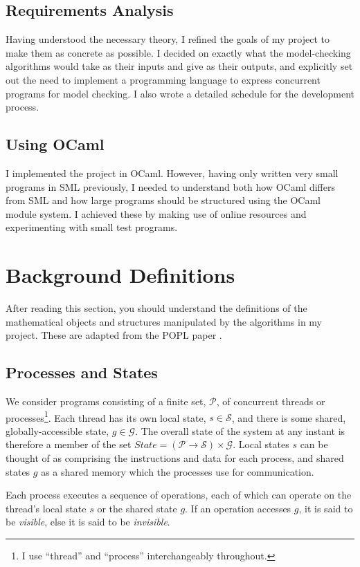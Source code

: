 \documentclass[12pt,a4paper,twoside,openany]{report}
\begin{document}
\subsection{Requirements Analysis}
Having understood the necessary theory,
I refined the goals of my project to
make them as concrete as possible.
I decided on exactly what the
model-checking algorithms would
take as their inputs and give
as their outputs, and
explicitly set out the need
to implement
a programming language
to express concurrent programs
for model checking. I also
wrote a detailed schedule for
the development process.

\subsection{Using OCaml}
I implemented the project in OCaml.
However, having only written very small
programs in SML previously, I needed to
understand both how OCaml differs from SML
and how large programs
should be structured
using the OCaml module system.
I achieved these
by making use of online resources and
experimenting with small test programs.

\section{Background Definitions} \label{sec:background-defs}
After reading this section, you should understand the
definitions of the mathematical objects and structures
manipulated by the algorithms in my project. 
These are adapted from the POPL paper \cite{flan05}.

\subsection{Processes and States}
We consider programs consisting of a finite set, $\mathcal{P}$,
of concurrent threads or processes\footnote{I use ``thread'' and
``process'' interchangeably throughout.}.
Each thread has its own local state, $s \in \mathcal{S}$, and there
is some shared, globally-accessible state, $g \in \mathcal{G}$. The overall
state of the system at any instant is therefore a member of the set
$ \textit{State} = (\mathcal{P} \to \mathcal{S}) \times \mathcal{G} $.
Local states $s$ can be thought of as comprising the instructions
and data for each process, and shared states $g$
as a shared memory which the processes use for communication.

Each process executes a sequence of operations, each of which can
operate on the thread's local state $s$ or the shared
state $g$. If an operation
accesses $g$, it is said to be \emph{visible}, else it is said to be
\emph{invisible}.
\end{document}
